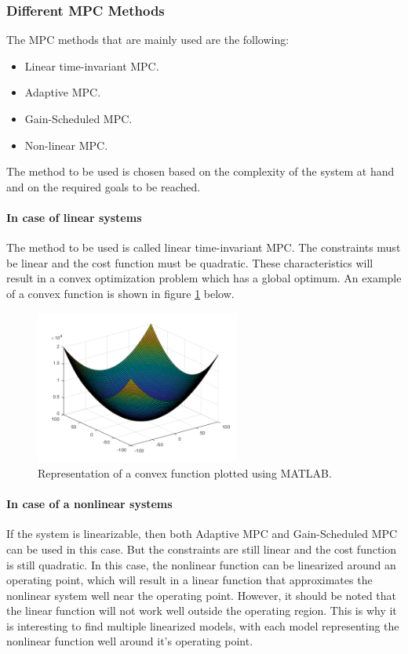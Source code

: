 \documentclass{thesisreport}
\begin{document}
\newpage


\subsubsection{Different MPC Methods}
The MPC methods that are mainly used are the following:

\begin{itemize}
	\item Linear time-invariant MPC.
	\item Adaptive MPC.
	\item Gain-Scheduled MPC.
	\item Non-linear MPC.
\end{itemize} 

\noindent The method to be used is chosen based on the complexity of the system at hand and on the required goals to be reached. 

\paragraph{In case of linear systems} The method to be used is called linear time-invariant MPC. The constraints must be linear and the cost function must be quadratic. These characteristics will result in a convex optimization problem \cite{ZEMAN2003325} which has a global optimum. An example of a convex function is shown in figure \ref{convex_function} below.

\begin{figure}[h]
\centering
\includegraphics[width=0.6\textwidth]{Images/Control/MPC_Convex_Equation}
\caption{Representation of a convex function plotted using MATLAB.}
\label{convex_function}
\end{figure}

\paragraph{In case of a nonlinear systems} If the system is linearizable, then both Adaptive MPC and Gain-Scheduled MPC can be used in this case. But the constraints are still linear and the cost function is still quadratic. In this case, the nonlinear function can be linearized around an operating point, which will result in a linear function that approximates the nonlinear system well near the operating point. However, it should be noted that the linear function will not work well outside the operating region. This is why it is interesting to find multiple linearized models, with each model representing the nonlinear function well around it's operating point.
\end{document}
